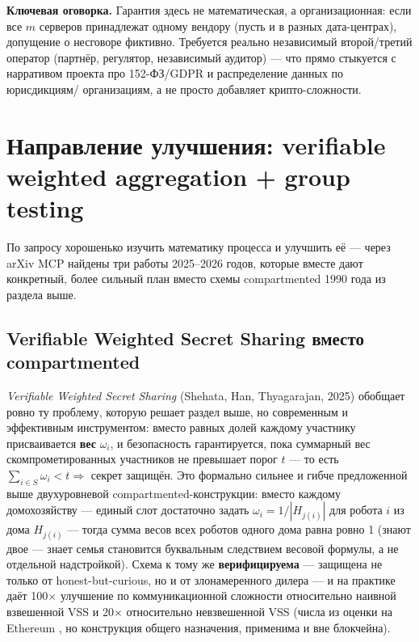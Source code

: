 \documentclass[11pt]{article}
\begin{document}
\textbf{Ключевая оговорка.} Гарантия здесь не математическая, а организационная:
если все $m$ серверов принадлежат одному вендору (пусть и в разных дата-центрах),
допущение о несговоре фиктивно. Требуется реально независимый второй/третий
оператор (партнёр, регулятор, независимый аудитор) — что прямо стыкуется с
нарративом проекта про 152-ФЗ/GDPR и распределение данных по юрисдикциям/
организациям, а не просто добавляет крипто-сложности.

\section{Направление улучшения: verifiable weighted aggregation + group testing}

По запросу \guillemotleft хорошенько изучить математику процесса и улучшить
её\guillemotright{} — через arXiv MCP найдены три работы 2025--2026 годов, которые
вместе дают конкретный, более сильный план вместо схемы compartmented 1990 года из
раздела выше.

\subsection*{Verifiable Weighted Secret Sharing вместо compartmented}

\emph{Verifiable Weighted Secret Sharing} \cite{vwss2025} (Shehata, Han,
Thyagarajan, 2025) обобщает ровно ту проблему, которую решает раздел выше, но
современным и эффективным инструментом: вместо равных долей каждому участнику
присваивается \textbf{вес} $\omega_i$, и безопасность гарантируется, пока суммарный
вес скомпрометированных участников не превышает порог $t$ — то есть
$\sum_{i\in S} \omega_i < t \Rightarrow$ секрет защищён. Это формально сильнее и
гибче предложенной выше двухуровневой compartmented-конструкции: вместо
\guillemotleft каждому домохозяйству — единый слот\guillemotright{} достаточно
задать $\omega_i = 1/|H_{j(i)}|$ для робота $i$ из дома $H_{j(i)}$ — тогда сумма
весов всех роботов одного дома равна ровно 1 (\guillemotleft знают двое — знает
семья\guillemotright{} становится буквальным следствием весовой формулы, а не
отдельной надстройкой). Схема к тому же \textbf{верифицируема} — защищена не только
от honest-but-curious, но и от злонамеренного дилера — и на практике даёт
100$\times$ улучшение по коммуникационной сложности относительно наивной
взвешенной VSS и 20$\times$ относительно невзвешенной VSS (числа из оценки на
Ethereum \cite{vwss2025}, но конструкция общего назначения, применима и вне
блокчейна).
\end{document}
